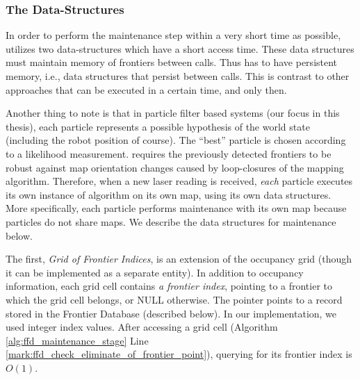 	\subsubsection{The \FFD Data-Structures}
	In order to perform the maintenance step within a very short time as possible,
	\FFD utilizes two data-structures which have a short access time.  These data structures
        must maintain memory of frontiers between calls. Thus \FFD has to have persistent memory,
        i.e., data structures that persist between calls. This is contrast to
        other approaches that can be executed in a certain time, and only then. 

	Another thing to note is that in particle filter based systems (our focus in
	this thesis), each particle represents a possible hypothesis of the world state
	(including the robot position of course). The ``best'' particle is chosen
	according to a likelihood measurement. \FFD requires the previously detected
	frontiers to be robust against map orientation changes caused by loop-closures
	of the mapping algorithm.
	Therefore, when a new laser reading is received, \emph{each} particle executes
	its own instance of \FFD algorithm on its own map, using its own data structures. More
	specifically, each particle performs maintenance with its own map because
	particles do not share maps.
	We describe the data structures for maintenance below.
	
The first, \emph{Grid of Frontier Indices}, is an extension
of the occupancy grid (though it can be implemented as a separate entity). In
addition to occupancy information, each grid cell contains \textit{a frontier
index}, pointing to a frontier to which the grid cell belongs, or NULL
otherwise. The pointer points to a record stored in the Frontier Database
(described below).
In our implementation, we used integer index values. After accessing a grid cell
(Algorithm \ref{alg:ffd_maintenance_stage} Line
\ref{mark:ffd_check_eliminate_of_frontier_point}), querying for its frontier
index is $O(1)$.
	
	
	
